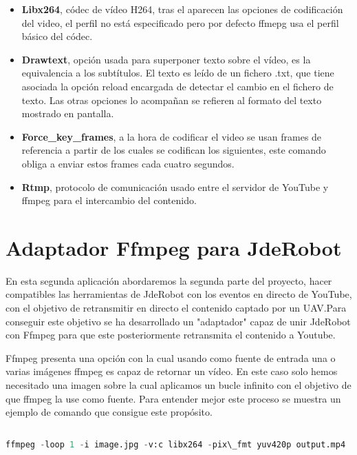 \begin{itemize}
\begin{itemize}
        \item \textbf{Libx264}, códec de vídeo H264, tras el aparecen las opciones de codificación del video, el perfil no está especificado pero por defecto ffmepg usa el perfil básico del códec.
        
        \item \textbf{Drawtext}, opción usada para superponer texto sobre el vídeo, es la equivalencia a los subtítulos. El texto es leído de un fichero .txt, que tiene asociada la opción reload encargada de detectar el cambio en el fichero de texto. Las otras opciones lo acompañan se refieren al formato del texto mostrado en pantalla.
    
        \item \textbf{Force\_key\_frames}, a la hora de codificar el video se usan frames de referencia a partir de los cuales se codifican los siguientes, este comando obliga a enviar estos frames cada cuatro segundos.
        
        \item \textbf{Rtmp}, protocolo de comunicación usado entre el servidor de YouTube y ffmpeg para el intercambio del contenido.
    \end{itemize}
\end{itemize}


\section{Adaptador Ffmpeg para JdeRobot}

En esta segunda aplicación abordaremos la segunda parte del proyecto, hacer compatibles las herramientas de JdeRobot con los eventos en directo de YouTube, con el objetivo de retransmitir en directo el contenido captado por un UAV.Para conseguir este objetivo se ha desarrollado un "adaptador" capaz de unir JdeRobot con Ffmpeg para que este posteriormente retransmita el contenido a Youtube.

Ffmpeg presenta una opción con la cual usando como fuente de entrada una o varias imágenes ffmpeg es capaz de retornar un vídeo. En este caso solo hemos necesitado una imagen sobre la cual aplicamos un bucle infinito con el objetivo de que ffmpeg la use como fuente. Para entender mejor este proceso se muestra un ejemplo de comando que consigue este propósito.

\begin{lstlisting}[language=Python]

ffmpeg -loop 1 -i image.jpg -v:c libx264 -pix\_fmt yuv420p output.mp4

\end{lstlisting}

